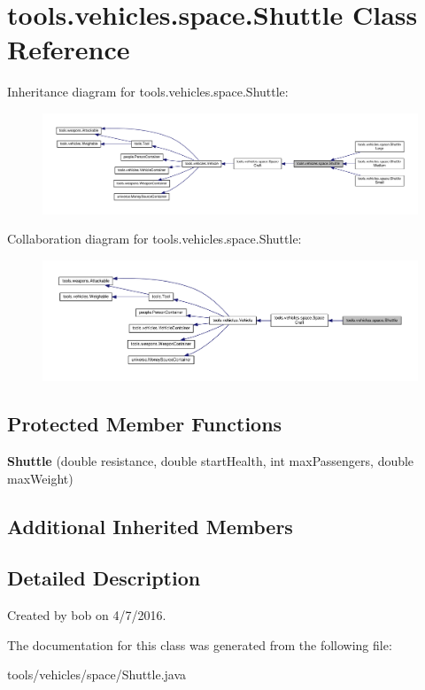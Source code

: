 \hypertarget{classtools_1_1vehicles_1_1space_1_1_shuttle}{}\section{tools.\+vehicles.\+space.\+Shuttle Class Reference}
\label{classtools_1_1vehicles_1_1space_1_1_shuttle}


Inheritance diagram for tools.\+vehicles.\+space.\+Shuttle\+:
\nopagebreak
\begin{figure}[H]
\begin{center}
\leavevmode
\includegraphics[width=350pt]{classtools_1_1vehicles_1_1space_1_1_shuttle__inherit__graph}
\end{center}
\end{figure}


Collaboration diagram for tools.\+vehicles.\+space.\+Shuttle\+:
\nopagebreak
\begin{figure}[H]
\begin{center}
\leavevmode
\includegraphics[width=350pt]{classtools_1_1vehicles_1_1space_1_1_shuttle__coll__graph}
\end{center}
\end{figure}
\subsection*{Protected Member Functions}
\begin{DoxyCompactItemize}
\item 
{\bfseries Shuttle} (double resistance, double start\+Health, int max\+Passengers, double max\+Weight)\hypertarget{classtools_1_1vehicles_1_1space_1_1_shuttle_a8e61194f7489941916f28e67db2831d3}{}\label{classtools_1_1vehicles_1_1space_1_1_shuttle_a8e61194f7489941916f28e67db2831d3}

\end{DoxyCompactItemize}
\subsection*{Additional Inherited Members}


\subsection{Detailed Description}
Created by bob on 4/7/2016. 

The documentation for this class was generated from the following file\+:\begin{DoxyCompactItemize}
\item 
tools/vehicles/space/Shuttle.\+java\end{DoxyCompactItemize}
